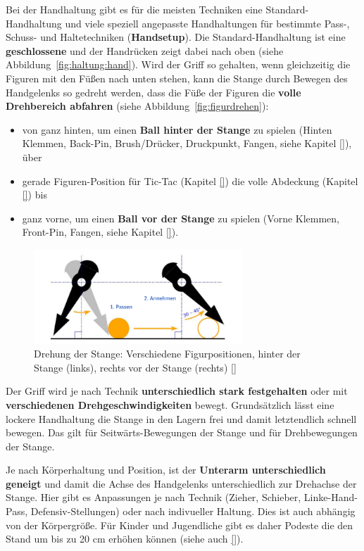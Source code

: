 Bei der Handhaltung gibt es für die meisten Techniken eine Standard-Handhaltung und viele speziell angepasste Handhaltungen für bestimmte Pass-, Schuss- und Haltetechniken (\textbf{Handsetup}). 
Die Standard-Handhaltung ist eine \textbf{geschlossene}
und der Handrücken zeigt dabei nach oben (siehe Abbildung~\ref{fig:haltung:hand}).
Wird der Griff so gehalten, wenn gleichzeitig die Figuren mit den Füßen nach unten stehen, kann die Stange durch Bewegen des Handgelenks so gedreht werden, dass die Füße der Figuren die \textbf{volle Drehbereich abfahren} (siehe Abbildung~\ref{fig:figurdrehen}):
\begin{itemize}
    \item von ganz hinten, um einen \textbf{Ball hinter der Stange} zu spielen (Hinten Klemmen, Back-Pin, Brush/Drücker, Druckpunkt, Fangen, siehe Kapitel \ref{}), über
    \item gerade Figuren-Position für Tic-Tac (Kapitel \ref{}) die volle Abdeckung (Kapitel \ref{}) bis 
    \item ganz vorne, um einen \textbf{Ball vor der Stange} zu spielen (Vorne Klemmen, Front-Pin, Fangen, siehe Kapitel \ref{}).
\end{itemize}

\begin{figure}
    \centering 
        \includegraphics[width=0.7\textwidth]{img/haltung_figur.png} 
        \caption{Drehung der Stange: Verschiedene Figurpositionen, hinter der Stange (links), rechts vor der Stange (rechts) [\cite{itsf_basics}]} 
        \label{fig:haltung:figur} 
\end{figure}

Der Griff wird je nach Technik \textbf{unterschiedlich stark festgehalten} oder mit \textbf{verschiedenen Drehgeschwindigkeiten} bewegt.
Grundsätzlich lässt eine lockere Handhaltung die Stange in den Lagern frei und damit letztendlich schnell bewegen.
Das gilt für Seitwärts-Bewegungen der Stange und für Drehbewegungen der Stange.

Je nach Körperhaltung und Position, ist der \textbf{Unterarm unterschiedlich geneigt} und damit die Achse des Handgelenks unterschiedlich zur Drehachse der Stange.
Hier gibt es Anpassungen je nach Technik (Zieher, Schieber, Linke-Hand-Pass, Defensiv-Stellungen) oder nach indivueller Haltung.
Dies ist auch abhängig von der Körpergröße. 
Für Kinder und Jugendliche gibt es daher Podeste die den Stand um bis zu 20 cm erhöhen können (siehe auch \ref{}).


